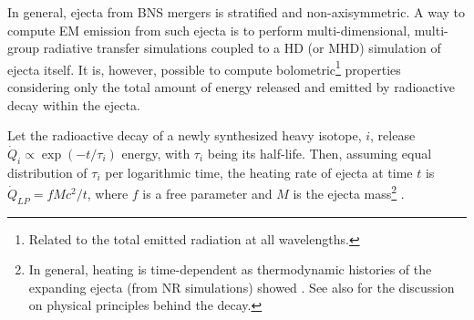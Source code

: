 In general, ejecta from \ac{BNS} mergers is stratified and non-axisymmetric. 
A way to compute \ac{EM} emission from such ejecta is to perform 
multi-dimensional, 
multi-group radiative transfer simulations coupled to a \ac{HD} (or \ac{MHD}) 
simulation of ejecta itself. %
%
It is, however, possible to compute bolometric\footnote{
    Related to the total emitted radiation at all wavelengths. 
} properties considering only the total amount 
of energy released and emitted by radioactive decay within the ejecta. 

%
%



Let the radioactive decay of a newly synthesized heavy isotope, $i$, release 
$\dot{Q}_i \propto \exp(-t/\tau_i)$ energy, with $\tau_i$ being its half-life.
Then, assuming equal distribution of $\tau_i$ per logarithmic time, 
the heating rate of ejecta at time $t$ is 
$\dot{Q}_{LP} = f M c^2 / t$,
where $f$ is a free parameter and $M$ is the ejecta mass\footnote{
    In general, heating is time-dependent as thermodynamic histories of the expanding 
    ejecta (from \ac{NR} simulations) showed \citep{Metzger:2010,Roberts:2011,Korobkin:2012uy}.
    See also \citet{Hotokezaka:2017dbk} for the discussion on physical 
    principles behind the decay.
} \citep{Metzger:2019zeh}.
%




